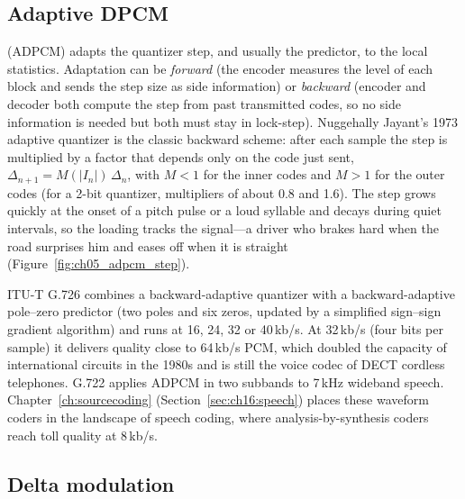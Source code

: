\subsection{Adaptive DPCM}

 (ADPCM) adapts the quantizer step, and usually the predictor, to the
local statistics. Adaptation can be \emph{forward} (the encoder measures the level of each
block and sends the step size as side information) or \emph{backward} (encoder and decoder
both compute the step from past transmitted codes, so no side information is needed but both
must stay in lock-step). Nuggehally Jayant's 1973 adaptive quantizer is the classic backward
scheme: after each sample the step is multiplied by a factor that depends only on the code just
sent, $\Delta_{n+1}=M(|I_n|)\,\Delta_n$, with $M<1$ for the inner codes and $M>1$ for the outer
codes (for a 2-bit quantizer, multipliers of about 0.8 and 1.6). The step grows quickly at the
onset of a pitch pulse or a loud syllable and decays during quiet intervals, so the loading
tracks the signal---a driver who brakes hard when the road surprises him and eases off when it is
straight (Figure~\ref{fig:ch05_adpcm_step}).


\begin{inpractice}
ITU-T G.726 combines a backward-adaptive quantizer with a backward-adaptive pole--zero predictor
(two poles and six zeros, updated by a simplified sign--sign gradient algorithm) and runs at 16,
24, 32 or 40\,kb/s. At 32\,kb/s (four bits per sample) it delivers quality close to 64\,kb/s PCM,
which doubled the capacity of international circuits in the 1980s and is still the voice codec
of DECT cordless telephones. G.722 applies ADPCM in two subbands to 7\,kHz wideband speech.
Chapter~\ref{ch:sourcecoding} (Section~\ref{sec:ch16:speech}) places these waveform coders in the
landscape of speech coding, where analysis-by-synthesis coders reach toll quality at 8\,kb/s.
\end{inpractice}

\subsection{Delta modulation}

